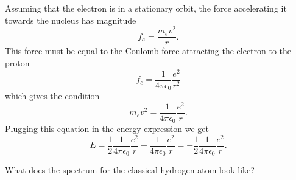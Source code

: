 Assuming that the electron is in a stationary orbit, the force accelerating it towards the nucleus has magnitude
\begin{equation}
f_a = \frac{m_e v^2}{r}.
\end{equation}
This force must be equal to the Coulomb force attracting the electron to the proton
\begin{equation}
f_c =  \frac{1}{4 \pi \epsilon_0} \frac{e^2}{r^2}
\end{equation}
which gives the condition
\begin{equation}
\label{eq:stationary_condition}
m_e v^2 = \frac{1}{4 \pi \epsilon_0} \frac{e^2}{r}.
\end{equation}
Plugging this equation in the energy expression we get
\begin{equation}
E = \frac{1}{2} \frac{1}{4 \pi \epsilon_0} \frac{e^2}{r} - \frac{1}{4 \pi \epsilon_0} \frac{e^2}{r}= - \frac{1}{2} \frac{1}{4 \pi \epsilon_0} \frac{e^2}{r}.
\end{equation}

\begin{exercise}
What does the spectrum for the classical hydrogen atom look like?
\end{exercise}

